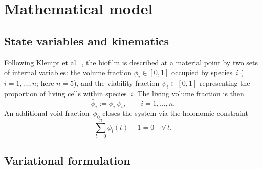 \documentclass[11pt,a4paper]{article}
\begin{document}
\section{Mathematical model}
\label{sec:model}

\subsection{State variables and kinematics}

Following Klempt et al.~\cite{Klempt2025ContinuumBiofilm, Klempt2024ContinuumGrowth}, the biofilm is described at a material point by two sets of internal variables: the volume fraction $\phi_i \in [0,1]$ occupied by species~$i$ ($i=1,\dots,n$; here $n=5$), and the viability fraction $\psi_i \in [0,1]$ representing the proportion of living cells within species~$i$.
The living volume fraction is then
\begin{equation}
\bar{\phi}_i := \phi_i\,\psi_i,
\qquad i=1,\dots,n.
\label{eq:living}
\end{equation}
An additional void fraction~$\phi_0$ closes the system via the holonomic constraint
\begin{equation}
\sum_{l=0}^{n}\phi_l(t) - 1 = 0 \quad\forall\,t.
\label{eq:constraint}
\end{equation}

\subsection{Variational formulation}
\end{document}
